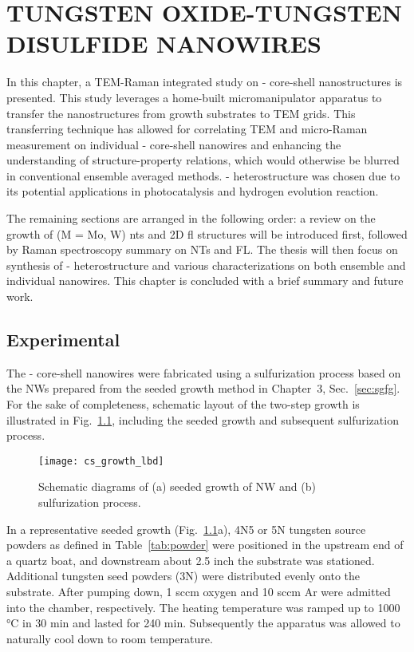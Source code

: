 \chapter{TUNGSTEN OXIDE-TUNGSTEN DISULFIDE NANOWIRES}

In this chapter, a TEM-Raman integrated study on - core-shell nanostructures is presented. This study leverages a home-built micromanipulator apparatus to transfer the nanostructures from growth substrates to TEM grids. This transferring technique has allowed for correlating TEM and micro-Raman measurement on individual - core-shell nanowires and enhancing the understanding of structure-property relations, which would otherwise be blurred in conventional ensemble averaged methods. - heterostructure was chosen due to its potential applications in photocatalysis and hydrogen evolution reaction.\cite{DiPaola1999,Chen2011b} 

The remaining sections are arranged in the following order: a review on the growth of  (M = Mo, W) \glspl{nt} and 2D \gls{fl} structures will be introduced first, followed by Raman spectroscopy summary on  NTs and FL. The thesis will then focus on synthesis of - heterostructure and various characterizations on both ensemble and individual nanowires. This chapter is concluded with a brief summary and future work.



\section{Experimental}

The - core-shell nanowires were fabricated using a sulfurization process based on the  NWs prepared from the seeded growth method in Chapter~3, Sec.~\ref{sec:sgfg}. For the sake of completeness, schematic layout of the two-step growth is illustrated in Fig.~\ref{fig:ch5grow}, including the seeded growth and subsequent sulfurization process.
\begin{figure}[htb]
\centering
\texttt{[image: cs\_growth\_lbd]}
\caption[Schematic diagrams of two-step synthesis process]{Schematic diagrams of (a) seeded growth of  NW and (b) sulfurization process. }
\label{fig:ch5grow}
\end{figure}
In a representative seeded growth (Fig.~\ref{fig:ch5grow}a), 4N5 or 5N tungsten source powders as defined in Table~\ref{tab:powder} were positioned in the upstream end of a quartz boat, and downstream about 2.5 inch the substrate was stationed. Additional tungsten seed powders (3N) were distributed evenly onto the substrate. After pumping down, 1 sccm oxygen and 10 sccm Ar were admitted into the chamber, respectively. The heating temperature was ramped up to 1000 \si{\degreeCelsius} in 30 min and lasted for 240 min. Subsequently the apparatus was allowed to naturally cool down to room temperature. 

